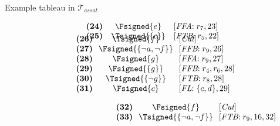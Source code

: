 \begin{frame}{Example tableau in $\mathcal{T}_{\textit{assat}}$}
\begin{center}
\begin{minipage}[t]{16cm}
\begin{minipage}[t]{6cm}
\[\begin{array}{lcl}
\textbf{(24)}                                      &
  \Fsigned{e}                                      &
  [\textit{FFA}{:}\;r_7, \text{23}]                \\
\textbf{(25)}                                      &
  \Tsigned{\{c\}}                                  &
  [\textit{FTB}{:}\;r_5, \text{22}]
\vspace{-0.7cm}
\end{array}
\]
%
\begin{minipage}[t]{1cm}
\[
\hspace{0.25cm}
\begin{array}{lcl}
\textbf{(26)}                                      &
  \Tsigned{f}                                      &
  [\textit{Cut}]                                   \\
\textbf{(27)}                                      & \hspace{-0.1cm}
  \Fsigned{\{\neg a,\neg f\}}      \hspace{-0.1cm} &
  [\textit{FFB}{:}\;r_9, \text{26}]                \\
\textbf{(28)}                                      &
  \Fsigned{g}                                      &
  [\textit{FFA}{:}\;r_9, \text{27}]                \\
\textbf{(29)}                                      &
  \Fsigned{\{g\}}                                  &
  [\textit{FFB}{:}\;r_4, r_6, \text{28}]            \\
\textbf{(30)}                                      &
  \Tsigned{\{\neg g\}}                     &
  [\textit{FTB}{:}\;r_8, \text{28}]                \\
\textbf{(31)}                                      &
  \Fsigned{c}                                      &
  [\textit{FL}{:}\;\{c,d\}, \text{29}]
\end{array}
\]
\end{minipage}
%
\begin{minipage}[t]{2cm}
\[
\hspace{3.75cm}
\begin{array}{lcl}
\textbf{(32)}                                      &
  \Fsigned{f}                                      &
  [\textit{Cut}]                                   \\
\textbf{(33)}                                      & \hspace{-0.1cm}
  \Tsigned{\{\neg a,\neg f\}}      \hspace{-0.1cm} &
  [\textit{FTB}{:}\;r_9, \text{16}, \text{32}]     \\

\end{array}\]
\end{minipage}
\end{minipage}
\end{minipage}
\end{center}
\end{frame}
